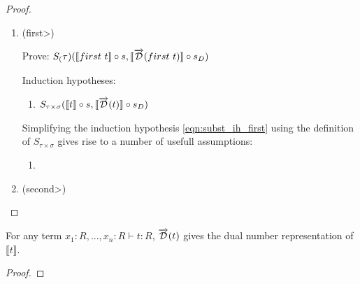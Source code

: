 \documentclass[11pt, final]{article}
\begin{document}
\begin{proof}
\begin{enumerate}
\begin{align*}
        & \Vdash \text{(Give witnesses of $S_\tau$ and $S_\sigma$ using respective IHs \ref{eqn:subst_ih_tuple1} and \ref{eqn:subst_ih_tuple2})} \\
        & \;\;\;\;\lambda x. (\llbracket t_1 \rrbracket(s(x)), \llbracket t_2 \rrbracket(s(x))) \\
        & \;\;\;\;\;\;\; = \lambda x. (\llbracket t_1 \rrbracket(s(x)), \llbracket t_2 \rrbracket(s(x))) \wedge \\
        & \;\;\;\;\lambda x. (\llbracket \D(t_1) \rrbracket(s'(x)), \llbracket \D(t_2) \rrbracket(s'(x))) \\
        & \;\;\;\;\;\;\; = \lambda x. (\llbracket \D(t_1) \rrbracket(s'(x)), \llbracket \D(t_2) \rrbracket(s'(x))) \\
        & \Vdash \text{(Reflexivity)} \\
      \end{align*}\qed
      \item (\<first>)

      Prove: $S_(\tau)(\llbracket first\ t \rrbracket \circ s, \llbracket \overrightarrow{\mathcal{D}}(first\ t) \rrbracket \circ s_D)$

      Induction hypotheses:
      \begin{enumerate}
        \item \label{eqn:subst_ih_first}$S_{\tau\times\sigma}(\llbracket t \rrbracket \circ s, \llbracket \overrightarrow{\mathcal{D}}(t) \rrbracket \circ s_D)$
      \end{enumerate}

      Simplifying the induction hypothesis \ref{eqn:subst_ih_first} using the definition of $S_{\tau\times\sigma}$ gives rise to a number of usefull assumptions:

      \begin{enumerate}
        \item
      \end{enumerate}

      \item (\<second>)
    \end{enumerate}
  \end{proof}

  \begin{theorem}
    For any term $x_1 : R, ..., x_n : R \vdash t : R$, $\overrightarrow{\mathcal{D}}(t)$ gives the dual number representation of $\llbracket t \rrbracket$.
  \end{theorem}

  \begin{proof}

  \end{proof}
\end{document}
